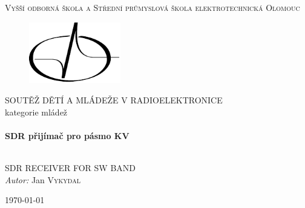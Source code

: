 \begin{titlepage}
  \begin{center}


  \textsc{\LARGE Vyšší odborná škola a Střední průmyslová škola elektrotechnická Olomouc}%

	\begin{figure}[H]
    \centering
    \includegraphics[width=4cm]{img/logo/logo.pdf}
  \end{figure}

  \textsc{\Large SOUTĚŽ DĚTÍ A MLÁDEŽE V RADIOELEKTRONICE}\\[0.5cm]
  kategorie mládež\\[.2cm]
	
	
	
  \HRule \\[0.4cm]
  { \huge \bfseries SDR přijímač pro pásmo KV\\[0.4cm] }

  \HRule \\[.5cm]
  
  SDR RECEIVER FOR SW BAND\\[1.5cm]
		
  \emph{Autor:} Jan \textsc{Vykydal}
  
  \vfill

  {\large \today}

  \end{center}
\end{titlepage}
